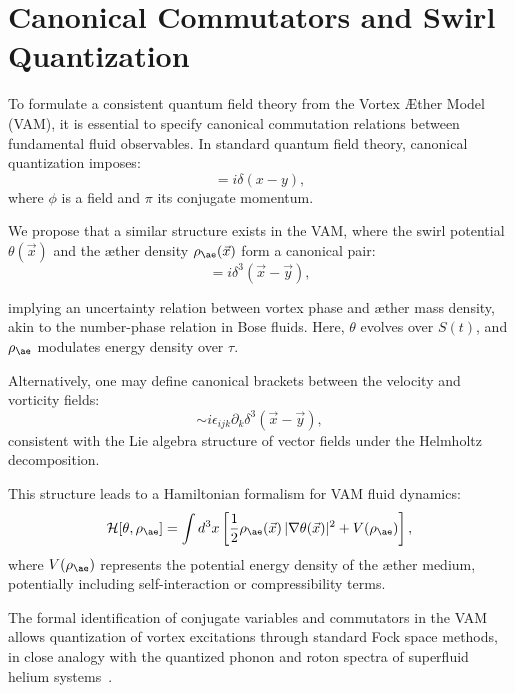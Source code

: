 
\section{Canonical Commutators and Swirl Quantization}

To formulate a consistent quantum field theory from the Vortex \AE{}ther Model (VAM), it is essential to specify canonical commutation relations between fundamental fluid observables. In standard quantum field theory, canonical quantization imposes:
\begin{equation}
[\phi(x), \pi(y)] = i \delta(x - y),
\end{equation}
where $\phi$ is a field and $\pi$ its conjugate momentum.

We propose that a similar structure exists in the VAM, where the swirl potential $\theta(\vec{x})$ and the \ae{}ther density $\rho_{\ae}(\vec{x})$ form a canonical pair:
\begin{equation}
[\theta(\vec{x}), \rho_{\ae}(\vec{y})] = i \delta^3(\vec{x} - \vec{y}),
\end{equation}

implying an uncertainty relation between vortex phase and \ae{}ther mass density, akin to the number-phase relation in Bose fluids. Here, $\theta$ evolves over $S(t)$, and $\rho_{\ae}$ modulates energy density over $\tau$.

Alternatively, one may define canonical brackets between the velocity and vorticity fields:
\begin{equation}
[v_i(\vec{x}), \omega_j(\vec{y})] \sim i \epsilon_{ijk} \partial_k \delta^3(\vec{x} - \vec{y}),
\end{equation}
consistent with the Lie algebra structure of vector fields under the Helmholtz decomposition.

This structure leads to a Hamiltonian formalism for VAM fluid dynamics:
\begin{equation}
\mathcal{H}[\theta, \rho_{\ae}] = \int d^3x \left[ \frac{1}{2} \rho_{\ae}(\vec{x})\, |\nabla \theta(\vec{x})|^2 + V(\rho_{\ae}) \right],
\end{equation}
where $V(\rho_{\ae})$ represents the potential energy density of the \ae{}ther medium, potentially including self-interaction or compressibility terms.

The formal identification of conjugate variables and commutators in the VAM allows quantization of vortex excitations through standard Fock space methods, in close analogy with the quantized phonon and roton spectra of superfluid helium systems~\cite{fetter1971nonuniform,stone2000superfluidity,verlinde2021qft}.
